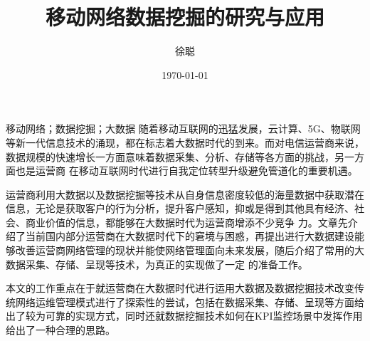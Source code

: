 \documentclass{HustGraduPaper}
\title{移动网络数据挖掘的研究与应用}
\author{徐聪}
\date{\today}
\begin{document}
    \maketitle 
    \statement
    \clearpage

    \begin{cnabstract}{移动网络；数据挖掘；大数据}
        随着移动互联网的迅猛发展，云计算、5G、物联网等新一代信息技术的涌现，都在标志着大数据时代的到来。而对电信运营商来说，数据规模的快速增长一方面意味着数据采集、分析、存储等各方面的挑战，另一方面也是运营商
        在移动互联网时代进行自我定位转型升级避免管道化的重要机遇。

        运营商利用大数据以及数据挖掘等技术从自身信息密度较低的海量数据中获取潜在信息，无论是获取客户的行为分析，提升客户感知，抑或是得到其他具有经济、社会、商业价值的信息，都能够在大数据时代为运营商增添不少竞争
        力。文章先介绍了当前国内部分运营商在大数据时代下的窘境与困惑，再提出进行大数据建设能够改善运营商网络管理的现状并能使网络管理面向未来发展，随后介绍了常用的大数据采集、存储、呈现等技术，为真正的实现做了一定
        的准备工作。
        
        本文的工作重点在于就运营商在大数据时代进行运用大数据及数据挖掘技术改变传统网络运维管理模式进行了探索性的尝试，包括在数据采集、存储、呈现等方面给出了较为可靠的实现方式，同时还就数据挖掘技术如何在KPI监控场景中发挥作用
        给出了一种合理的思路。


    \end{cnabstract}
\end{document}
